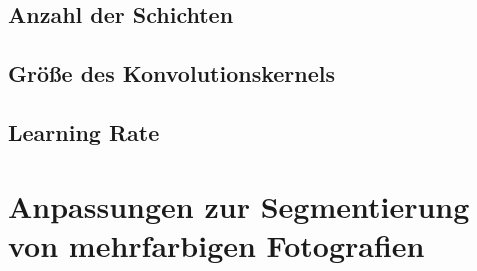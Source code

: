 \subsection{Anzahl der Schichten}

\subsection{Größe des Konvolutionskernels}

\subsection{Learning Rate}


\section{Anpassungen zur Segmentierung von mehrfarbigen Fotografien}
\label{sec:color_picture_optimization}